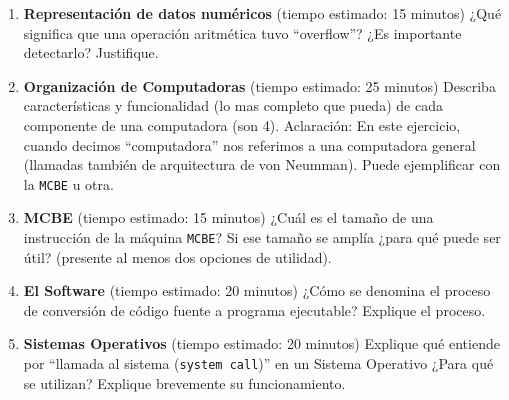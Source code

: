 \documentclass[12pt]{article}
\def\maketitle{

\makeatletter{
    \color{blue} \centering \huge \sc
    \textbf{
        Examen final regular
    }\\
    \par
}
\makeatother

\makeatletter


}
\begin{document}
\begin{minipage}[c]{\linewidth}
\thispagestyle{empty}
\maketitle

\begin{enumerate}[topsep=4pt,itemsep=2pt,partopsep=2pt, parsep=2pt]

    \item \textbf{Representación de datos numéricos}
        \small{(tiempo estimado: 15 minutos)}
        ¿Qué significa que una operación aritmética tuvo ``overflow''? ¿Es
        importante detectarlo? Justifique.

    \item \textbf{Organización de Computadoras}
        \small{(tiempo estimado: 25 minutos)}
        Describa características y funcionalidad (lo mas completo que pueda)
        de cada componente de una computadora (son 4). Aclaración: En este
        ejercicio, cuando decimos ``computadora'' nos referimos a una
        computadora general (llamadas también de arquitectura de von Neumman).
        Puede ejemplificar con la \texttt{MCBE} u otra.

    \item \textbf{MCBE}
        \small{(tiempo estimado: 15 minutos)} ¿Cuál es el tamaño de una
        instrucción de la máquina \texttt{MCBE}? Si ese tamaño se amplía ¿para
        qué puede ser útil? (presente al menos dos opciones de utilidad).

    \item \textbf{El Software}
        \small{(tiempo estimado: 20 minutos)} ¿Cómo se denomina el proceso de
        conversión de código fuente a programa ejecutable? Explique el
        proceso.

    \item \textbf{Sistemas Operativos}
        \small{(tiempo estimado: 20 minutos)} Explique qué entiende por
        ``llamada al sistema (\texttt{system call})'' en un Sistema Operativo
        ¿Para qué se utilizan? Explique brevemente su funcionamiento.

\end{enumerate}
\end{minipage}

\vspace{5em}
\end{document}
